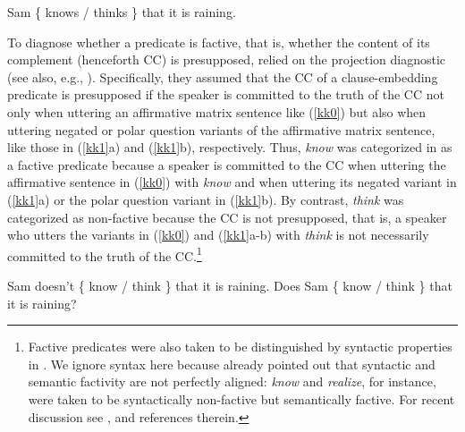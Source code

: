 \documentclass[11pt,fleqn]{article}
\newcommand{\6}{\mbox{$[\hspace*{-.6mm}[$}}
\newcommand{\9}{\mbox{$]\hspace*{-.6mm}]$}}
\begin{document}
\begin{exe}
\ex\label{kk0} Sam \{ knows / thinks \} that it is raining.
\end{exe}
To diagnose whether a predicate is factive, that is, whether the content of its complement (henceforth CC) is presupposed, \citealt{kiparsky-kiparsky70} relied on the projection diagnostic (see also, e.g., \citealt{langendoen-savin71}). Specifically, they assumed that the CC of a clause-embedding predicate is presupposed if the speaker is committed to the truth of the CC not only when uttering an affirmative matrix sentence like (\ref{kk0}) but also when uttering negated or polar question variants of the affirmative matrix sentence, like those in (\ref{kk1}a) and (\ref{kk1}b), respectively. Thus, {\em know} was categorized in \citealt{kiparsky-kiparsky70} as a factive predicate because a speaker is committed to the CC when uttering the affirmative sentence in (\ref{kk0}) with {\em know} and when uttering its negated variant in (\ref{kk1}a) or the polar question variant in (\ref{kk1}b). By contrast, {\em think} was categorized as non-factive because the CC is not presupposed, that is, a speaker who utters the variants in (\ref{kk0}) and (\ref{kk1}a-b) with {\em think} is not necessarily committed to the truth of the CC.\footnote{Factive predicates were also taken to be distinguished by syntactic properties in \citealt{kiparsky-kiparsky70}. We ignore syntax here because \citet[fn.3]{kiparsky-kiparsky70} already pointed out that syntactic and semantic factivity are not perfectly aligned: {\em know} and {\em realize}, for instance, were taken to be syntactically non-factive but semantically factive. For recent discussion see \citealt{white-rawlins-nels2018}, \citealt{djaerv-thesis} and references therein.}  


\begin{exe}
\ex\label{kk1}
\begin{xlist}
\ex Sam doesn't \{ know / think  \} that it is raining.
\ex Does Sam \{ know / think  \} that it is raining?
\end{xlist}
\end{exe}
\end{document}
